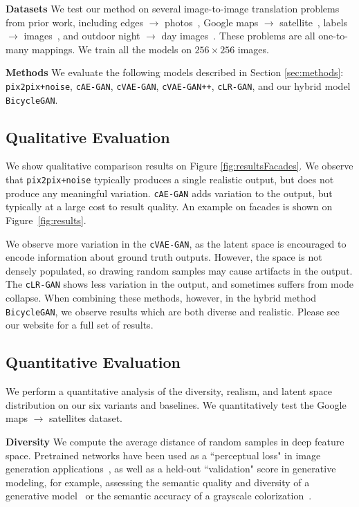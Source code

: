 \documentclass{article}
\newcommand{\ppn}{\texttt{pix2pix+noise}\xspace}
\newcommand{\cinfogan}{\texttt{cLR-GAN}\xspace}
\newcommand{\cae}{\texttt{cAE-GAN}\xspace}
\newcommand{\cvaegan}{\texttt{cVAE-GAN}\xspace}
\newcommand{\cvaeganp}{\texttt{cVAE-GAN++}\xspace}
\newcommand{\bicycle}{\texttt{BicycleGAN}\xspace} \newcommand{\G}{G\xspace}
\begin{document}
{\bf Datasets} We test our method on several image-to-image translation problems from prior work, including edges $\rightarrow$ photos~\citep{yu2014fine,zhu2016generative}, Google maps $\rightarrow$ satellite~\citep{isola2016image}, labels $\rightarrow$ images~\citep{Cordts2016Cityscapes}, and outdoor night $\rightarrow$ day images~\citep{Laffont14}. These problems are all one-to-many mappings. We train all the models on $256\times 256$ images.


{\bf Methods} We evaluate the following models described in Section \ref{sec:methods}: \ppn, \cae, \cvaegan, \cvaeganp, \cinfogan, and our hybrid model \bicycle.

\subsection{Qualitative Evaluation}
\vspace{-1mm}
We show qualitative comparison results on Figure \ref{fig:resultsFacades}. We observe that \ppn typically produces a single realistic output, but does not produce any meaningful variation.
\cae adds variation to the output, but typically at a large cost to result quality. An example on facades is shown on Figure~\ref{fig:results}.

We observe more variation in the \cvaegan, as the latent space is encouraged to encode information about ground truth outputs. However, the space is not densely populated, so drawing random samples may cause artifacts in the output. The \cinfogan shows less variation in the output, and sometimes suffers from mode collapse. When combining these methods, however, in the hybrid method \bicycle, we observe results which are both diverse and realistic. Please see our website for a full set of results.

\vspace{-1mm}
\subsection{Quantitative Evaluation}
\vspace{-1mm}
We perform a quantitative analysis of the diversity, realism, and latent space distribution on our six variants and baselines. We quantitatively test the Google maps $\rightarrow$ satellites dataset.

{\bf Diversity} We compute the average distance of random samples in deep feature space. Pretrained networks have been used as a ``perceptual loss" in image generation applications~\citep{gatys2016image,johnson2016perceptual,dosovitskiy2016generating}, as well as a held-out ``validation" score in generative modeling, for example, assessing the semantic quality and diversity of a generative model~\citep{salimans2016improved} or the semantic accuracy of a grayscale colorization~\citep{zhang2016colorful}.
\end{document}

